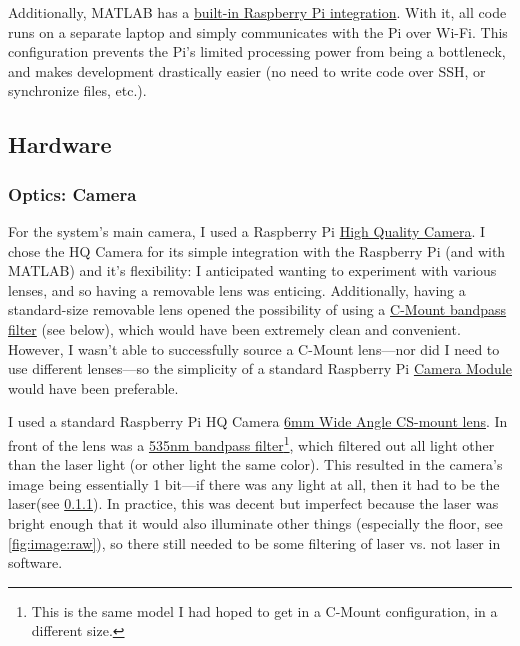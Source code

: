 \documentclass{article}
\begin{document}
Additionally, MATLAB has a \href{https://www.mathworks.com/help/supportpkg/raspberrypiio/index.html}{built-in Raspberry Pi integration}. With it, all code runs on a separate laptop and simply communicates with the Pi over Wi-Fi. This configuration prevents the Pi's limited processing power from being a bottleneck, and makes development drastically easier (no need to write code over SSH, or synchronize files, etc.).
    
\subsection{Hardware} \label{sec:methods:hardware}

\subsubsection{Optics: Camera} \label{sec:methods:hardware:optics-camera}

For the system's main camera, I used a Raspberry Pi \href{https://www.raspberrypi.org/products/raspberry-pi-high-quality-camera/}{High Quality Camera}. I chose the HQ Camera for its simple integration with the Raspberry Pi (and with MATLAB) and it's flexibility: I anticipated wanting to experiment with various lenses, and so having a removable lens was enticing. Additionally, having a standard-size removable lens opened the possibility of using a \hyperlink{https://www.rmaelectronics.com/midwest-optical-bn535/}{C-Mount bandpass filter} (see below), which would have been extremely clean and convenient. However, I wasn't able to successfully source a C-Mount lens---nor did I need to use different lenses---so the simplicity of a standard Raspberry Pi \hyperlink{https://www.raspberrypi.org/products/camera-module-v2/}{Camera Module} would have been preferable.

I used a standard Raspberry Pi HQ Camera \hyperlink{https://www.sparkfun.com/products/16762}{6mm Wide Angle CS-mount lens}. In front of the lens was a \hyperlink{https://www.rmaelectronics.com/midwest-optical-bn535/}{535nm bandpass filter}\footnote{This is the same model I had hoped to get in a C-Mount configuration, in a different size.}, which filtered out all light other than the laser light (or other light the same color). This resulted in the camera's image being essentially 1 bit---if there was any light at all, then it had to be the laser(see \ref{sec:methods:hardware:optics-camera}). In practice, this was decent but imperfect because the laser was bright enough that it would also illuminate other things (especially the floor, see \autoref{fig:image:raw}), so there still needed to be some filtering of laser vs. not laser in software.
\end{document}
